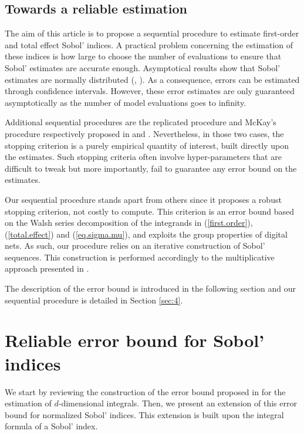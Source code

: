\subsection{Towards a reliable estimation}
\label{sec:2.3}
The aim of this article is to propose a sequential procedure to estimate first-order and total effect Sobol' indices.  A practical problem concerning the estimation of these indices is how large to choose the number of evaluations to ensure that Sobol' estimates are accurate enough. Asymptotical results show that Sobol' estimates are normally distributed (\cite[Proposition 2.2]{Janon}, \cite[Proposition 3.5]{Tissot}). As a consequence, errors can be estimated through confidence intervals. However, these error estimates are only guaranteed asymptotically as the number of model evaluations goes to infinity.

Additional sequential procedures are the replicated procedure and McKay's procedure respectively proposed in \cite{Gilquin.rec} and \cite{Tong}. Nevertheless, in those two cases, the stopping criterion is a purely empirical quantity of interest, built directly upon the estimates. Such stopping criteria often involve hyper-parameters that are difficult to tweak but more importantly, fail to guarantee any error bound on the estimates. 

Our sequential procedure stands apart from others since it proposes a robust stopping criterion, not costly to compute. This criterion is an error bound based on the Walsh series decomposition of the integrands in (\ref{first.order}), (\ref{total.effect}) and (\ref{eq.sigma.mu}), and exploits the group properties of digital nets. As such, our procedure relies on an iterative construction of Sobol' sequences. This construction is performed accordingly to the multiplicative approach presented in \cite{GJAHMP}.

The description of the error bound is introduced in the following section and our sequential procedure is detailed in Section \ref{sec:4}.


\section{Reliable error bound for Sobol' indices}
\label{sec:3} 
We start by reviewing the construction of the error bound proposed in \cite{HicJim} for the estimation of $d$-dimensional integrals. Then, we present an extension of this error bound for normalized Sobol' indices. This extension is built upon the integral formula of a Sobol' index.


